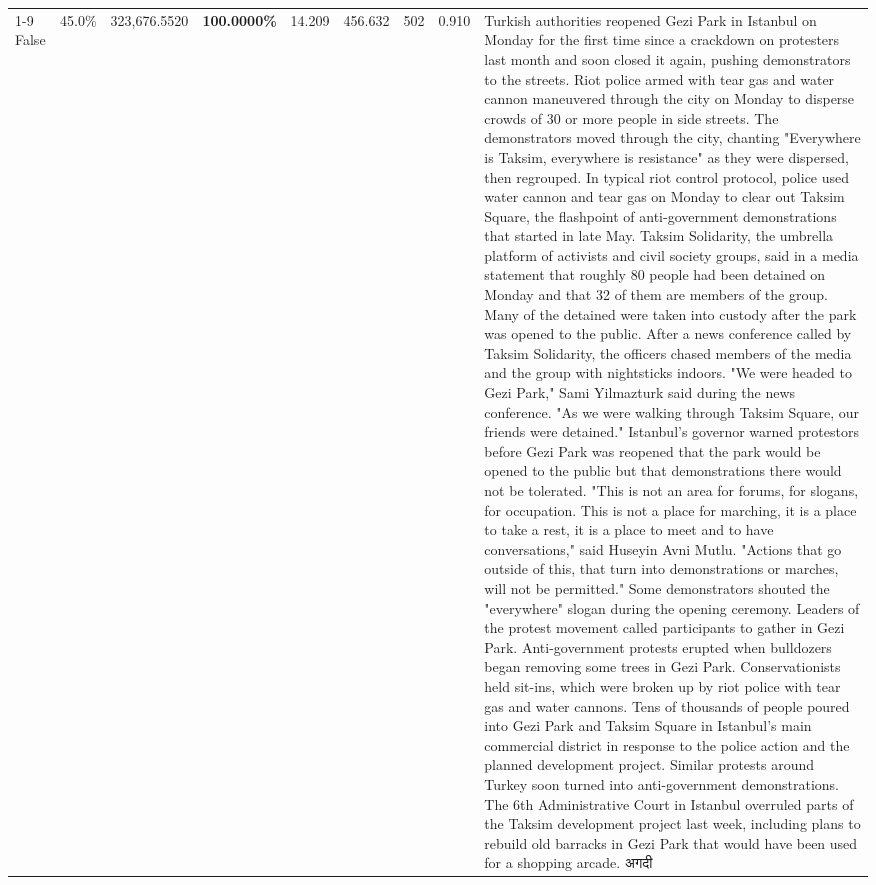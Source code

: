 \begin{table}[H]
\begin{tabular}{lllrlllll}
\cline{1-9}
False & 45.0\% & 323,676.5520 & \bfseries \color{red} 100.0000\% & 14.209 & 456.632 & 502 & 0.910 & Turkish authorities reopened Gezi Park in Istanbul on Monday for the first time since a crackdown on protesters last month and soon closed it again, pushing demonstrators to the streets. Riot police armed with tear gas and water cannon maneuvered through the city on Monday to disperse crowds of 30 or more people in side streets. The demonstrators moved through the city, chanting "Everywhere is Taksim, everywhere is resistance" as they were dispersed, then regrouped. In typical riot control protocol, police used water cannon and tear gas on Monday to clear out Taksim Square, the flashpoint of anti-government demonstrations that started in late May. Taksim Solidarity, the umbrella platform of activists and civil society groups, said in a media statement that roughly 80 people had been detained on Monday and that 32 of them are members of the group. Many of the detained were taken into custody after the park was opened to the public. After a news conference called by Taksim Solidarity, the officers chased members of the media and the group with nightsticks indoors. "We were headed to Gezi Park," Sami Yilmazturk said during the news conference. "As we were walking through Taksim Square, our friends were detained." Istanbul's governor warned protestors before Gezi Park was reopened that the park would be opened to the public but that demonstrations there would not be tolerated. "This is not an area for forums, for slogans, for occupation. This is not a place for marching, it is a place to take a rest, it is a place to meet and to have conversations," said Huseyin Avni Mutlu. "Actions that go outside of this, that turn into demonstrations or marches, will not be permitted." Some demonstrators shouted the "everywhere" slogan during the opening ceremony. Leaders of the protest movement called participants to gather in Gezi Park. Anti-government protests erupted when bulldozers began removing some trees in Gezi Park. Conservationists held sit-ins, which were broken up by riot police with tear gas and water cannons. Tens of thousands of people poured into Gezi Park and Taksim Square in Istanbul's main commercial district in response to the police action and the planned development project. Similar protests around Turkey soon turned into anti-government demonstrations. The 6th Administrative Court in Istanbul overruled parts of the Taksim development project last week, including plans to rebuild old barracks in Gezi Park that would have been used for a shopping arcade. अगदी \\

\end{tabular}
\end{table}
